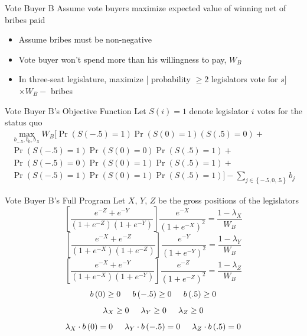 \documentclass[handout]{beamer}
\begin{document}
\begin{frame}{Vote Buyer B}
\pause
Assume vote buyers maximize expected value of winning net of bribes paid  
\pause
\begin{itemize}[<+->]
	\item Assume bribes must be non-negative
	\item Vote buyer won't spend more than his willingness to pay, $W_B$
	\item In three-seat legislature, maximize $[$ probability $\geq 2$ legislators vote for $s ]$ $\times W_B -$ bribes
\end{itemize}
\end{frame}

\begin{frame}{Vote Buyer B's Objective Function}
\pause
Let $S(i) = 1$ denote legislator $i$ votes for the status quo
\pause
\begin{multline*}
			    \max_{b_{-.5}, b_0, b_{.5}} 
					W_B \biggl[ \Pr\left(S\left(-.5\right)=1\right)\Pr\left(S\left(0\right)=1\right)\left(S\left(.5\right)=0\right)  + \\
					\Pr\left(S\left(-.5\right)=1\right)\Pr\left(S\left(0\right)=0\right)\Pr\left(S\left(.5\right)=1\right) + \\
					\Pr\left(S\left(-.5\right)=0\right)\Pr\left(S\left(0\right)=1\right)\Pr\left(S\left(.5\right)=1\right) + \\
					\Pr\left(S\left(-.5\right)=1\right)\Pr\left(S\left(0\right)=1\right)\Pr\left(S\left(.5\right)=1\right) \biggr] - \sum_{j\in \left\{-.5, 0,.5\right\}} b_j
				\end{multline*}
\end{frame}


\begin{frame}{Vote Buyer B's Full Program}
\pause
Let $X$, $Y$, $Z$ be the gross positions of the legislators
\pause
\begin{equation}
    \left[\frac{e^{-Z} + e^{-Y}}{\left(1+e^{-Z}\right)\left(1+e^{-Y}\right)} \right] \frac{e^{-X}}{\left(1+e^{-X}\right)^2}= \frac{1 - \lambda_X}{W_B}
		\label{eq:focB}
\end{equation}
\begin{equation}
    \left[\frac{e^{-X} + e^{-Z}}{\left(1+e^{-X}\right)\left(1+e^{-Z}\right)} \right] \frac{e^{-Y}}{\left(1+e^{-Y}\right)^2}= \frac{1 - \lambda_Y}{W_B}
\end{equation}
\begin{equation}
    \left[\frac{e^{-X} + e^{-Y}}{\left(1+e^{-X}\right)\left(1+e^{-Y}\right)} \right] \frac{e^{-Z}}{\left(1+e^{-Z}\right)^2} = \frac{1 - \lambda_Z}{W_B}
\end{equation}
\[
  b\left(0\right) \geq0 \hskip.2in b\left(-.5\right) \geq0 \hskip.2in b\left(.5\right) \geq0 
\]
\[
  \lambda_X \geq0 \hskip.2in \lambda_Y \geq0 \hskip.2in \lambda_Z \geq0 
\]
\[
  \lambda_X \cdot b\left(0\right) = 0 \hskip.2in \lambda_Y \cdot b\left(-.5\right) = 0 \hskip.2in \lambda_Z \cdot b\left(.5\right) = 0 
\]

\end{frame}
\end{document}
